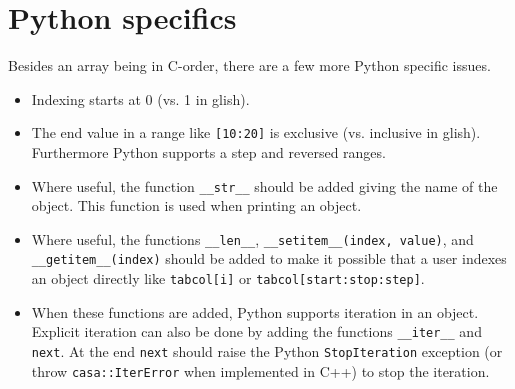 \section{Python specifics}
Besides an array being in C-order, there are a few more Python
specific issues.
\begin{itemize}
\item Indexing starts at 0 (vs. 1 in glish).
\item The end value in a range like \texttt{[10:20]} is exclusive
(vs. inclusive in glish). Furthermore Python supports a step and
reversed ranges.
\item Where useful, the function \texttt{\_\_str\_\_} should be added
  giving the name of the object. This function is used when printing
  an object.
\item Where useful, the functions \texttt{\_\_len\_\_},
\texttt{\_\_setitem\_\_(index, value)}, and 
\texttt{\_\_getitem\_\_(index)} should
be added to make it possible that a user indexes an object directly like
\texttt{tabcol[i]} or \texttt{tabcol[start:stop:step]}.
\item When these functions are added, Python supports iteration in an
object. Explicit iteration can also be done by adding the functions
\texttt{\_\_iter\_\_} and \texttt{next}. At the end \texttt{next}
should raise the Python \texttt{StopIteration} exception
(or throw \texttt{casa::IterError}
when implemented in C++) to stop the iteration.
\end{itemize}
